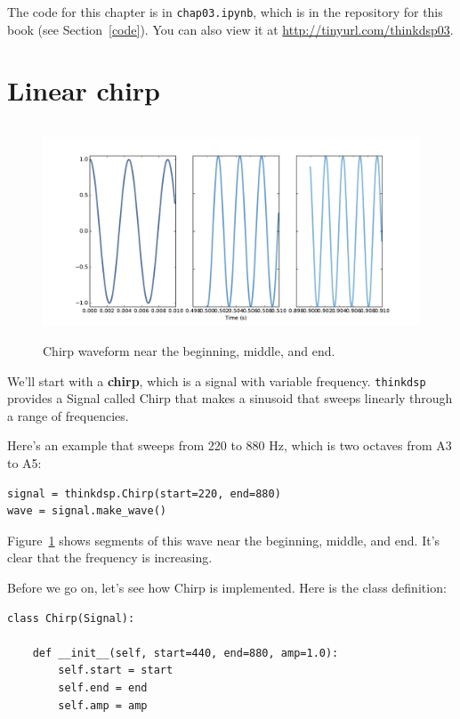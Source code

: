 \documentclass[12pt]{book}
\begin{document}
The code for this chapter is in {\tt chap03.ipynb}, which is in the
repository for this book (see Section~\ref{code}).
You can also view it at \url{http://tinyurl.com/thinkdsp03}.


\section{Linear chirp}

\begin{figure}
\centerline{\includegraphics[height=2.5in]{figs/chirp3.pdf}}
\caption{Chirp waveform near the beginning, middle, and end.}
\label{fig.chirp3}
\end{figure}

We'll start with a {\bf chirp}, which is a signal with variable
frequency.  {\tt thinkdsp} provides a Signal called Chirp that
makes a sinusoid that sweeps linearly through a range of
frequencies.

Here's an example that sweeps from 220 to 880 Hz, which
is two octaves from A3 to A5:

\begin{verbatim}
signal = thinkdsp.Chirp(start=220, end=880)
wave = signal.make_wave()
\end{verbatim}

Figure~\ref{fig.chirp3} shows segments of this wave near the
beginning, middle, and end.  It's clear that the frequency is
increasing.

Before we go on, let's see how Chirp is implemented.  Here
is the class definition:

\begin{verbatim}
class Chirp(Signal):

    def __init__(self, start=440, end=880, amp=1.0):
        self.start = start
        self.end = end
        self.amp = amp
\end{verbatim}
\end{document}
